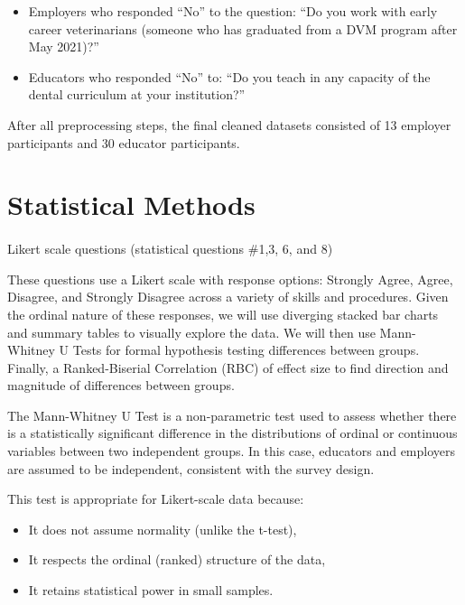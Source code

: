 \documentclass[
  12pt,
  letterpaper,
  DIV=11,
  numbers=noendperiod]{scrartcl}
\makeatletter
\let\oldparagraph\paragraph
\renewcommand{\paragraph}{
    \@ifstar
      \xxxParagraphStar
      \xxxParagraphNoStar
  }
\newcommand{\xxxParagraphStar}[1]{\oldparagraph*{#1}\mbox{}}
\newcommand{\xxxParagraphNoStar}[1]{\oldparagraph{#1}\mbox{}}
\providecommand{\tightlist}{%
  \setlength{\itemsep}{0pt}\setlength{\parskip}{0pt}}\usepackage{longtable,booktabs,array}
\numberwithin{figure}{section}
\numberwithin{table}{section}
\makeatother
\begin{document}
\begin{itemize}
\item
  Employers who responded ``No'' to the question: ``Do you work with
  early career veterinarians (someone who has graduated from a DVM
  program after May 2021)?''
\item
  Educators who responded ``No'' to: ``Do you teach in any capacity of
  the dental curriculum at your institution?''
\end{itemize}

After all preprocessing steps, the final cleaned datasets consisted of
13 employer participants and 30 educator participants.

\section{Statistical Methods}\label{statistical-methods}

\paragraph{Likert scale questions (statistical questions \#1,3, 6, and
8)}\label{likert-scale-questions-statistical-questions-13-6-and-8}

These questions use a Likert scale with response options: Strongly
Agree, Agree, Disagree, and Strongly Disagree across a variety of skills
and procedures. Given the ordinal nature of these responses, we will use
diverging stacked bar charts and summary tables to visually explore the
data. We will then use Mann-Whitney U Tests for formal hypothesis
testing differences between groups. Finally, a Ranked-Biserial
Correlation (RBC) of effect size to find direction and magnitude of
differences between groups.

The Mann-Whitney U Test is a non-parametric test used to assess whether
there is a statistically significant difference in the distributions of
ordinal or continuous variables between two independent groups. In this
case, educators and employers are assumed to be independent, consistent
with the survey design.

This test is appropriate for Likert-scale data because:

\begin{itemize}
\tightlist
\item
  It does not assume normality (unlike the t-test),
\item
  It respects the ordinal (ranked) structure of the data,
\item
  It retains statistical power in small samples.
\end{itemize}
\end{document}
